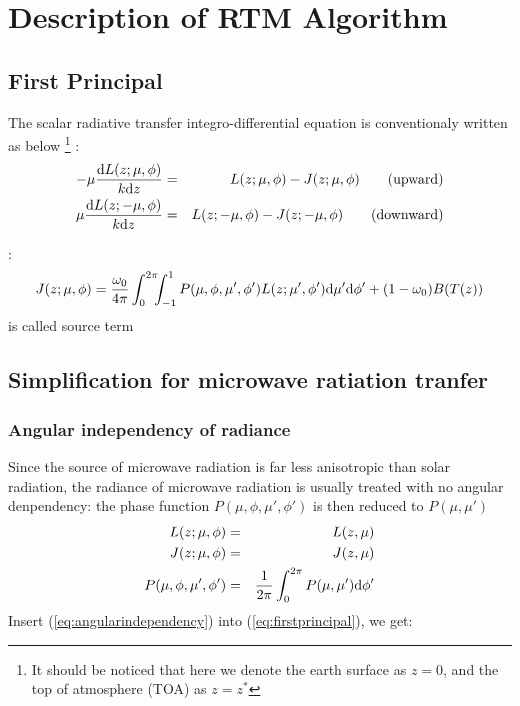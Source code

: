 \chapter{Description of RTM Algorithm}

\section{First Principal}
The scalar radiative transfer integro-differential equation is conventionaly
written as below
\footnote{It should be noticed that here we denote the earth surface as $z = 0$, 
and the top of atmosphere (TOA) as $z = z^{*}$}
:  
\begin{eqnarray} \label{eq:firstprincipal}
-\mu \frac{\mathrm{d} L(z; \mu, \phi)}{k \mathrm{d} z} & = & 
L(z; \mu, \phi) - J(z; \mu, \phi) \qquad \textrm{(upward)} \nonumber\\
\mu \frac{\mathrm{d} L(z; -\mu, \phi)}{k \mathrm{d} z} & = & 
L(z; -\mu, \phi) - J(z; -\mu, \phi) \qquad \textrm{(downward)}
\end{eqnarray}

:
\begin{equation} \label{eq:sourceterm1}
    J(z; \mu, \phi) = 
    \frac{\omega_{0}}{4\pi}\int_{0}^{2\pi}\!\!\!\int_{-1}^{1}
    P(\mu, \phi, \mu', \phi')L(z;\mu',\phi')\mathrm{d}\mu'\mathrm{d}\phi'
    + (1-\omega_{0})B(T(z))
\end{equation}
is called source term

\section{Simplification for microwave ratiation tranfer}
\subsection{Angular independency of radiance}
Since the source of microwave radiation is far less anisotropic than solar radiation,
the radiance of microwave radiation is usually treated with no angular denpendency:
the phase function $P(\mu,\phi,\mu',\phi')$ is then reduced to $P(\mu,\mu')$
\begin{eqnarray} \label{eq:angularindependency}
    L(z;\mu,\phi) & = & L(z,\mu) \nonumber\\
    J(z;\mu,\phi) & = & J(z,\mu) \nonumber\\
    P(\mu,\phi,\mu',\phi') & = & \frac{1}{2\pi}\int_{0}^{2\pi}P(\mu,\mu')\mathrm{d}\phi'
\end{eqnarray}
Insert (\ref{eq:angularindependency}) into (\ref{eq:firstprincipal}), we get:

